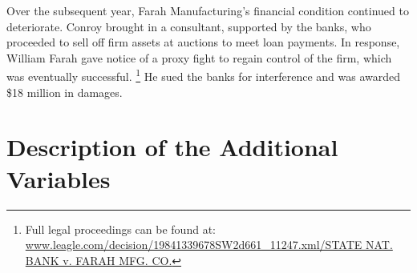 \documentclass[12pt]{article}
\begin{document}
\begin{appendices}
Over the subsequent year, Farah Manufacturing's financial condition continued to deteriorate.
Conroy brought in a consultant, supported by the banks, who proceeded to sell off firm assets at auctions to meet loan payments.
In response, William Farah gave notice of a proxy fight to regain control of the firm, which was eventually successful.%
    \footnote{Full legal proceedings can be found at: \href{https://web.archive.org/web/20151029083607/http://www.leagle.com/decision/19841339678SW2d661_11247.xml/STATE\%20NAT.\%20BANK\%20v.\%20FARAH\%20MFG.\%20CO}{www.leagle.com/decision/19841339678SW2d661\_11247.xml/STATE NAT. BANK v. FARAH MFG. CO.}}
He sued the banks for interference and was awarded \$18 million in damages.






\section{Description of the Additional Variables}
\label{IApp:vardef}
\vspace{-1em}







%
%

\newsavebox\secretbib
\savebox\secretbib{\parbox{\textwidth}{}}










\end{appendices}
\end{document}
